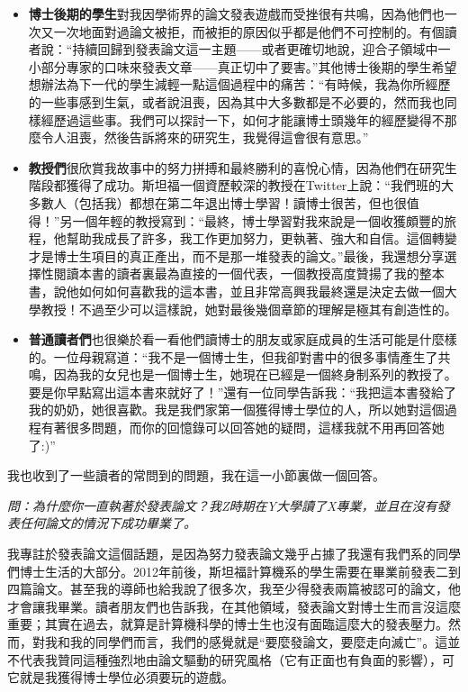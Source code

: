 \documentclass[12pt,UTF8,nofonts]{book}
\begin{document}
\begin{itemize}
  \item \textbf{博士後期的學生}對我因學術界的論文發表遊戲而受挫很有共鳴，因為他們也一次又一次地面對過論文被拒，而被拒的原因似乎都是他們不可控制的。有個讀者說：“持續回歸到發表論文這一主題——或者更確切地說，迎合子領域中一小部分專家的口味來發表文章——真正切中了要害。”其他博士後期的學生希望想辦法為下一代的學生減輕一點這個過程中的痛苦：“有時候，我為你所經歷的一些事感到生氣，或者說沮喪，因為其中大多數都是不必要的，然而我也同樣經歷過這些事。我們可以探討一下，如何才能讓博士頭幾年的經歷變得不那麼令人沮喪，然後告訴將來的研究生，我覺得這會很有意思。”
  \item \textbf{教授們}很欣賞我故事中的努力拼搏和最終勝利的喜悅心情，因為他們在研究生階段都獲得了成功。斯坦福一個資歷較深的教授在Twitter上說：“我們班的大多數人（包括我）都想在第二年退出博士學習！讀博士很苦，但也很值得！”另一個年輕的教授寫到：“最終，博士學習對我來說是一個收獲頗豐的旅程，他幫助我成長了許多，我工作更加努力，更執著、強大和自信。這個轉變才是博士生項目的真正產出，而不是那一堆發表的論文。”最後，我還想分享選擇性閱讀本書的讀者裏最為直接的一個代表，一個教授高度贊揚了我的整本書，說他如何如何喜歡我的這本書，並且非常高興我最終還是決定去做一個大學教授！不過至少可以這樣說，她對最後幾個章節的理解是極其有創造性的。
  \item \textbf{普通讀者們}也很樂於看一看他們讀博士的朋友或家庭成員的生活可能是什麼樣的。一位母親寫道：“我不是一個博士生，但我卻對書中的很多事情產生了共鳴，因為我的女兒也是一個博士生，她現在已經是一個終身制系列的教授了。要是你早點寫出這本書來就好了！”還有一位同學告訴我：“我把這本書發給了我的奶奶，她很喜歡。我是我們家第一個獲得博士學位的人，所以她對這個過程有著很多問題，而你的回憶錄可以回答她的疑問，這樣我就不用再回答她了:)”
\end{itemize}

\breakline

我也收到了一些讀者的常問到的問題，我在這一小節裏做一個回答。

\emph{問：為什麼你一直執著於發表論文？我Z時期在Y大學讀了X專業，並且在沒有發表任何論文的情況下成功畢業了。}

我專註於發表論文這個話題，是因為努力發表論文幾乎占據了我還有我們系的同學們博士生活的大部分。2012年前後，斯坦福計算機系的學生需要在畢業前發表二到四篇論文。甚至我的導師也給我說了很多次，我至少得發表兩篇被認可的論文，他才會讓我畢業。讀者朋友們也告訴我，在其他領域，發表論文對博士生而言沒這麼重要；其實在過去，就算是計算機科學的博士生也沒有面臨這麼大的發表壓力。然而，對我和我的同學們而言，我們的感覺就是“要麼發論文，要麼走向滅亡”。這並不代表我贊同這種強烈地由論文驅動的研究風格（它有正面也有負面的影響），可它就是我獲得博士學位必須要玩的遊戲。
\end{document}
